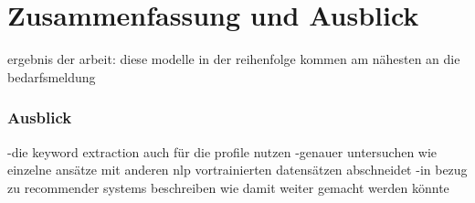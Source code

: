 \chapter{Zusammenfassung und Ausblick}
\label{chap:ergebnisse}

ergebnis der arbeit: diese modelle in der reihenfolge kommen am nähesten an die bedarfsmeldung

\subsection*{Ausblick}
-die keyword extraction auch für die profile nutzen 
-genauer untersuchen wie einzelne ansätze mit anderen nlp vortrainierten datensätzen abschneidet
-in bezug zu recommender systems beschreiben wie damit weiter gemacht werden könnte
\newpage
